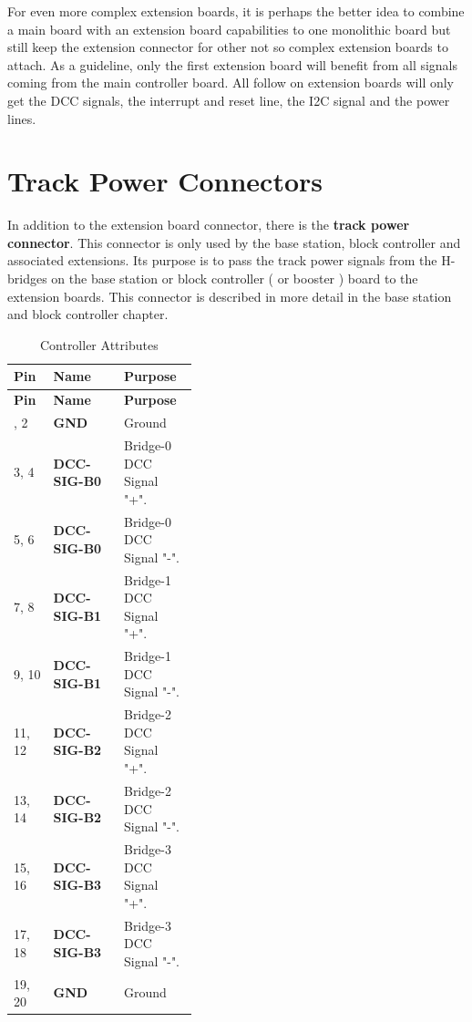 For even more complex extension boards, it is perhaps the better idea to combine a main board with an extension board capabilities to one monolithic board but still keep the extension connector for other not so complex extension boards to attach. As a guideline, only the first extension board will benefit from all signals coming from the main controller board. All follow on extension boards will only get the DCC signals, the interrupt and reset line, the I2C signal and the power lines.

\section{Track Power Connectors}

In addition to the extension board connector, there is the \textbf{track power connector}. This connector is only used by the base station, block controller and associated extensions. Its purpose is to pass the track power signals from the H-bridges on the base station or block controller ( or booster ) board to the extension boards. This connector is described in more detail in the base station and block controller chapter.

\begin{longtable}{@{}|l|l|p{0.4\linewidth}|@{}}
    \caption{Controller Attributes} \\
    \toprule
    \textbf{Pin} & \textbf{Name} & \textbf{Purpose} \\
    \midrule
    \endfirsthead
    \toprule
    \textbf{Pin} & \textbf{Name} & \textbf{Purpose} \\
    \midrule
    \endhead
    \midrule
    \endfoot
    \bottomrule
    \endlastfoot
    1, 2 & \textbf{GND} & Ground \\
    \midrule
    3, 4 & \textbf{DCC-SIG-B0} & Bridge-0 DCC Signal "+". \\
    \midrule
    5, 6 & \textbf{DCC-SIG-B0} & Bridge-0 DCC Signal "-". \\
    \midrule
    7, 8 & \textbf{DCC-SIG-B1} & Bridge-1 DCC Signal "+". \\
    \midrule
    9, 10 & \textbf{DCC-SIG-B1} & Bridge-1 DCC Signal "-". \\
    \midrule
    11, 12 & \textbf{DCC-SIG-B2} & Bridge-2 DCC Signal "+". \\
    \midrule
    13, 14 & \textbf{DCC-SIG-B2} & Bridge-2 DCC Signal "-". \\
    \midrule
    15, 16 & \textbf{DCC-SIG-B3} & Bridge-3 DCC Signal "+". \\
    \midrule
    17, 18 & \textbf{DCC-SIG-B3} & Bridge-3 DCC Signal "-". \\
    \midrule
    19, 20 & \textbf{GND} & Ground \\
\end{longtable}%

